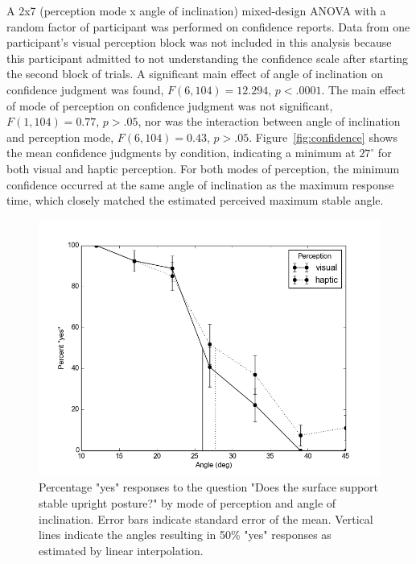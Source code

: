 \documentclass{article}
\begin{document}
A 2x7 (perception mode x angle of inclination) mixed-design ANOVA with a random factor of participant was performed on confidence reports. Data from one participant's visual perception block was not included in this analysis because this participant admitted to not understanding the confidence scale after starting the second block of trials. A significant main effect of angle of inclination on confidence judgment was found, $F(6, 104) = 12.294$, $p < .0001$. The main effect of mode of perception on confidence judgment was not significant, $F(1, 104) = 0.77$, $p > .05$, nor was the interaction between angle of inclination and perception mode, $F(6, 104) = 0.43$, $p > .05$. Figure~\ref{fig:confidence} shows the mean confidence judgments by condition, indicating a minimum at $27^\circ$ for both visual and haptic perception. For both modes of perception, the minimum confidence occurred at the same angle of inclination as the maximum response time, which closely matched the estimated perceived maximum stable angle.

\begin{figure}
\includegraphics[scale=0.7]{can_step.png}
\caption{\label{fig:pct}Percentage "yes" responses to the question "Does the surface support stable upright posture?" by mode of perception and angle of inclination. Error bars indicate standard error of the mean. Vertical lines indicate the angles resulting in 50\% "yes" responses as estimated by linear interpolation.}
\end{figure}
\end{document}
